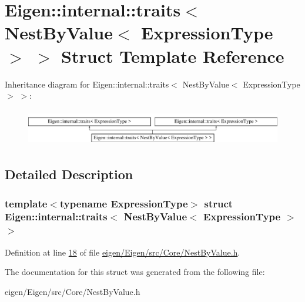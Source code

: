 \hypertarget{struct_eigen_1_1internal_1_1traits_3_01_nest_by_value_3_01_expression_type_01_4_01_4}{}\section{Eigen\+:\+:internal\+:\+:traits$<$ Nest\+By\+Value$<$ Expression\+Type $>$ $>$ Struct Template Reference}
\label{struct_eigen_1_1internal_1_1traits_3_01_nest_by_value_3_01_expression_type_01_4_01_4}
Inheritance diagram for Eigen\+:\+:internal\+:\+:traits$<$ Nest\+By\+Value$<$ Expression\+Type $>$ $>$\+:\begin{figure}[H]
\begin{center}
\leavevmode
\includegraphics[height=1.627907cm]{struct_eigen_1_1internal_1_1traits_3_01_nest_by_value_3_01_expression_type_01_4_01_4}
\end{center}
\end{figure}


\subsection{Detailed Description}
\subsubsection*{template$<$typename Expression\+Type$>$\newline
struct Eigen\+::internal\+::traits$<$ Nest\+By\+Value$<$ Expression\+Type $>$ $>$}



Definition at line \hyperlink{eigen_2_eigen_2src_2_core_2_nest_by_value_8h_source_l00018}{18} of file \hyperlink{eigen_2_eigen_2src_2_core_2_nest_by_value_8h_source}{eigen/\+Eigen/src/\+Core/\+Nest\+By\+Value.\+h}.



The documentation for this struct was generated from the following file\+:\begin{DoxyCompactItemize}
\item 
eigen/\+Eigen/src/\+Core/\+Nest\+By\+Value.\+h\end{DoxyCompactItemize}
